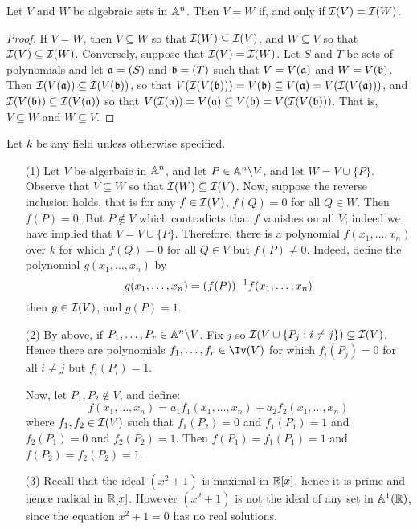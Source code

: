 \begin{proposition}
  Let $V$ and $W$ be algebraic sets in $\A^n$. Then $V=W$ if, and only
  if  $\Ic(V)=\Ic(W)$.
\end{proposition}
\begin{proof}
  If $V=W$, then  $V \subseteq W$ so that $\Ic(W) \subseteq \Ic(V)$,
  and $W \subseteq V$ so that $\Ic(V) \subseteq \Ic(W)$. Conversely,
  suppose that $\Ic(V)=\Ic(W)$. Let $S$ and $T$ be sets of
  polynomials and let $\af=(S)$ and $\bf=(T)$ such that
  $V=V(\af)$ and $W=V(\bf)$. Then $\Ic(V(\af)) \subseteq \Ic(V(\bf))$,
  so that $V(\Ic(V(\bf)))=V(\bf) \subseteq V(\af)=V(\Ic(V(\af)))$,
  and $\Ic(V(\bf)) \subseteq \Ic(V(\af))$ so that $V(\Ic(\af))=
  V(\af) \subseteq V(\bf)=V(\Ic(V(\bf)))$. That is, $V \subseteq W$
  and $W \subseteq V$.
\end{proof}

\begin{example}\label{example_10.4}
  Let $k$ be any field unless otherwise specified.
  \begin{enumerate}
    \item[(1)] Let $V$ be algerbaic in $\A^n$, and let $P \in
      \com{\A^n}{V}$, and let $W=V \cup \{P\}$. Observe that $V
      \subseteq W$ so that $\Ic(W) \subseteq \Ic(V)$. Now, suppose the
      reverse inclusion holds, that is for any $f \in \Ic(V)$,
      $f(Q)=0$ for all $Q \in W$. Then $f(P)=0$. But $P \notin V$
      which contradicts that $f$ vanishes on all $V$; indeed we have
      implied that $V=V \cup \{P\}$. Therefore, there is a polynomial
      $f(x_1, \dots, x_n)$ over $k$ for which $f(Q)=0$ for all $Q \in
      V$ but $f(P) \neq 0$. Indeed, define the polynomial $g(x_1,
      \dots, x_n)$ by
      \begin{equation*}
        g(x_1, \dots, x_n)=\inv{(f(P))}f(x_1, \dots, x_n)
      \end{equation*}
      then $g \in \Ic(V)$, and $g(P)=1$.

    \item[(2)] By above, if $P_1, \dots, P_r \in \com{\A^n}{V}$. Fix
      $j$ so $\Ic(V \cup \{P_j : i \neq j\}) \subseteq \Ic(V)$.
      Hence there are polynomials $f_1, \dots, f_r \in \Iv(V)$ for which
      $f_i(P_j)=0$ for all $i \neq j$ but $f_i(P_i)=1$.

      Now, let $P_1, P_2 \notin V$, and define:
      \begin{equation*}
        f(x_1, \dots, x_n)=a_1f_1(x_1, \dots, x_n)+a_2f_2(x_1, \dots,
        x_n)
      \end{equation*}
      where $f_1, f_2 \in \Ic(V)$ such that $f_1(P_2)=0$ and
      $f_1(P_1)=1$ and $f_2(P_1)=0$ and $f_2(P_2)=1$. Then
      $f(P_1)=f_1(P_1)=1$ and $f(P_2)=f_2(P_2)=1$.

    \item[(3)] Recall that the ideal $(x^2+1)$ is maximal in $\R[x]$,
      hence it is prime and hence radical in $\R[x]$. However
      $(x^2+1)$ is not the ideal of any set in $\A^1(\R)$, since the
      equation $x^2+1=0$ has no real solutions.
  \end{enumerate}
\end{example}

